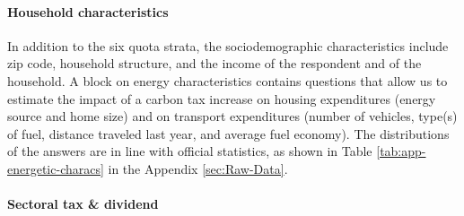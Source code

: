 \documentclass[12pt]{article} %
\begin{document}
\paragraph{Household characteristics}
In addition to the six quota strata, the sociodemographic characteristics include zip code, household structure, and the income of the respondent and of the household. A block on energy characteristics contains questions that allow us to estimate the impact of a carbon tax increase on housing expenditures (energy source and home size) and on transport expenditures (number of vehicles, type(s) of fuel, distance traveled last year, and average fuel economy). The distributions of the answers are in line with official statistics, as shown in Table \ref{tab:app-energetic-characs} in the Appendix \ref{sec:Raw-Data}.

\paragraph{Sectoral tax \& dividend} %

\end{document}
